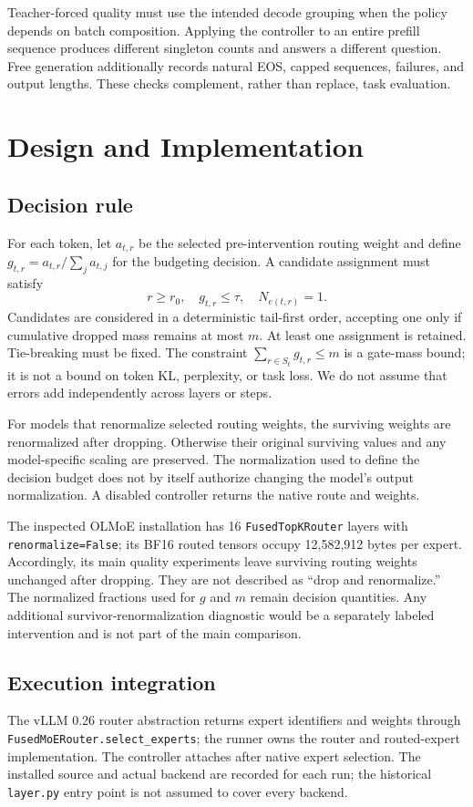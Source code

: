 \documentclass[10pt,twocolumn]{article}
\begin{document}
Teacher-forced quality must use the intended decode grouping when the policy depends on batch composition. Applying the controller to an entire prefill sequence produces different singleton counts and answers a different question. Free generation additionally records natural EOS, capped sequences, failures, and output lengths. These checks complement, rather than replace, task evaluation.

\section{Design and Implementation}
\subsection{Decision rule}
For each token, let $a_{t,r}$ be the selected pre-intervention routing weight and define $g_{t,r}=a_{t,r}/\sum_j a_{t,j}$ for the budgeting decision. A candidate assignment must satisfy
\begin{equation}
r\ge r_0,\quad g_{t,r}\le\tau,\quad N_{e(t,r)}=1.
\end{equation}
Candidates are considered in a deterministic tail-first order, accepting one only if cumulative dropped mass remains at most $m$. At least one assignment is retained. Tie-breaking must be fixed. The constraint $\sum_{r\in S_t}g_{t,r}\le m$ is a gate-mass bound; it is not a bound on token KL, perplexity, or task loss. We do not assume that errors add independently across layers or steps.

For models that renormalize selected routing weights, the surviving weights are renormalized after dropping. Otherwise their original surviving values and any model-specific scaling are preserved. The normalization used to define the decision budget does not by itself authorize changing the model's output normalization. A disabled controller returns the native route and weights.

The inspected OLMoE installation has 16 \texttt{FusedTopKRouter} layers with \texttt{renormalize=False}; its BF16 routed tensors occupy 12,582,912 bytes per expert. Accordingly, its main quality experiments leave surviving routing weights unchanged after dropping. They are not described as ``drop and renormalize.'' The normalized fractions used for $g$ and $m$ remain decision quantities. Any additional survivor-renormalization diagnostic would be a separately labeled intervention and is not part of the main comparison.

\subsection{Execution integration}
The vLLM 0.26 router abstraction returns expert identifiers and weights through \texttt{FusedMoERouter.select\_experts}; the runner owns the router and routed-expert implementation. The controller attaches after native expert selection. The installed source and actual backend are recorded for each run; the historical \texttt{layer.py} entry point is not assumed to cover every backend.
\end{document}

